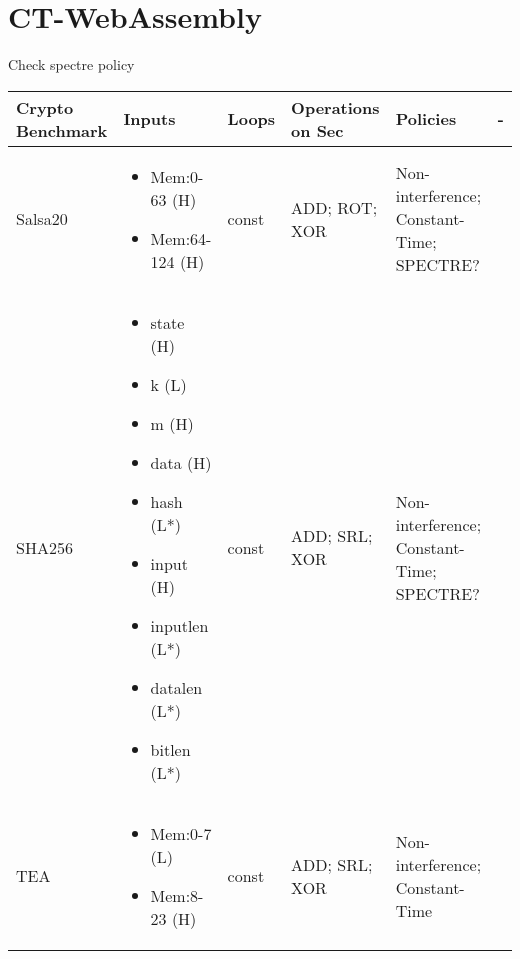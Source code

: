 \documentclass[12pt]{article} %
\begin{document}
\section{CT-WebAssembly}
Check spectre policy
{\footnotesize
\begin{longtable}{|M{0.12\textwidth}|M{0.18\textwidth}M{0.12\textwidth}M{0.12\textwidth}M{0.20\textwidth}M{0.12\textwidth}|}
  \hline
  Crypto Benchmark & Inputs& Loops & Operations on Sec&Policies & - \\
  \hline
  Salsa20 &
      \begin{itemize}
      \item Mem:0-63 (H)
      \item Mem:64-124 (H)
      \end{itemize} & const& ADD; ROT; XOR & Non-interference; Constant-Time; SPECTRE? &\\\hline
  SHA256 &
      \begin{itemize}
      \item state (H)
      \item k (L)
      \item m (H)
      \item data (H)
      \item hash (L*)
      \item input (H)
      \item inputlen (L*)
      \item datalen (L*)
      \item bitlen (L*)
      \end{itemize} & const& ADD; SRL; XOR & Non-interference; Constant-Time; SPECTRE? &\\\hline
  TEA &
      \begin{itemize}
      \item Mem:0-7 (L)
      \item Mem:8-23 (H)
      \end{itemize} & const& ADD; SRL; XOR & Non-interference; Constant-Time &\\\hline
      \hline
\end{longtable}
}
\end{document}
